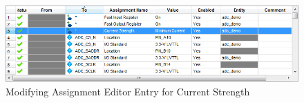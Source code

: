 \documentclass[11pt, twoside, pdftex]{article}
\newcommand{\commonPath}{../../Common}
\begin{document}
\begin{figure} [H]
\begin{center}
\includegraphics [scale = 0.5] {figures/assignment_editor.png}
\end {center}
\caption{Modifying Assignment Editor Entry for Current Strength}
\label{fig:assign_editor}
\end{figure}




\end{document}
